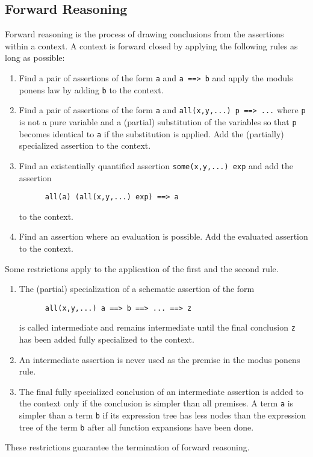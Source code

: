 \subsection{Forward Reasoning}

Forward reasoning is the process of drawing conclusions from the assertions
within a context. A context is forward closed by applying the following rules
as long as possible:
%
\begin{enumerate}
\item Find a pair of assertions of the form \lstinline!a! and
  \lstinline!a ==> b! and apply the moduls ponens law by adding \lstinline!b!
  to the context.

\item Find a pair of assertions of the form \lstinline!a! and
  \lstinline!all(x,y,...) p ==> ...!  where \lstinline!p! is not a pure
  variable and a (partial) substitution of the variables so that \lstinline!p!
  becomes identical to \lstinline!a! if the substitution is applied. Add the
  (partially) specialized assertion to the context.

\item Find an existentially quantified assertion \lstinline!some(x,y,...) exp!
  and add the assertion
  \begin{lstlisting}
      all(a) (all(x,y,...) exp) ==> a
  \end{lstlisting}
  to the context.

\item Find an assertion where an evaluation is possible. Add the evaluated
  assertion to the context.
\end{enumerate}

\noindent Some restrictions apply to the application of the first and the second rule.
\begin{enumerate}
\item The (partial) specialization of a schematic assertion of the form
  \begin{lstlisting}
      all(x,y,...) a ==> b ==> ... ==> z
  \end{lstlisting}
  is called intermediate and remains intermediate until the final conclusion
  \lstinline!z! has been added fully specialized to the context.

\item An intermediate assertion is never used as the premise in the modus
  ponens rule.

\item The final fully specialized conclusion of an intermediate assertion is
  added to the context only if the conclusion is simpler than all premises. A
  term \lstinline!a! is simpler than a term \lstinline!b! if its expression
  tree has less nodes than the expression tree of the term \lstinline!b! after
  all function expansions have been done.
\end{enumerate}
These restrictions guarantee the termination of forward reasoning.


